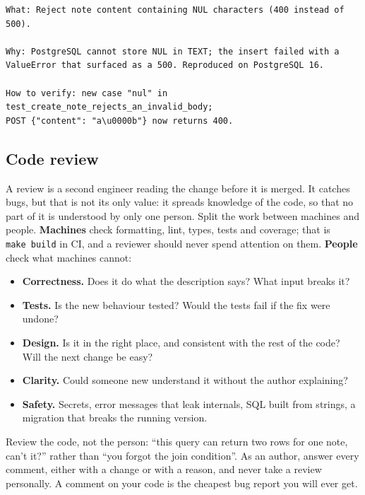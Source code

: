 \begin{outputbox}[short]
\begin{Verbatim}[fontsize=\codesize, breaklines, breakanywhere, breaksymbolleft={\tiny\textcolor{muted}{$\hookrightarrow$}}]
What: Reject note content containing NUL characters (400 instead of 500).

Why: PostgreSQL cannot store NUL in TEXT; the insert failed with a
ValueError that surfaced as a 500. Reproduced on PostgreSQL 16.

How to verify: new case "nul" in test_create_note_rejects_an_invalid_body;
POST {"content": "a\u0000b"} now returns 400.
\end{Verbatim}
\end{outputbox}

\subsection*{Code review}\label{17-build-process:code-review}

A review is a second engineer reading the change before it is merged. It catches bugs, but that is not its only value: it spreads knowledge of the code, so that no part of it is understood by only one person. Split the work between machines and people. \textbf{Machines} check formatting, lint, types, tests and coverage; that is \texttt{make\ build} in CI, and a reviewer should never spend attention on them. \textbf{People} check what machines cannot:

\begin{itemize}
\tightlist
\item
  \textbf{Correctness.} Does it do what the description says? What input breaks it?
\item
  \textbf{Tests.} Is the new behaviour tested? Would the tests fail if the fix were undone?
\item
  \textbf{Design.} Is it in the right place, and consistent with the rest of the code? Will the next change be easy?
\item
  \textbf{Clarity.} Could someone new understand it without the author explaining?
\item
  \textbf{Safety.} Secrets, error messages that leak internals, SQL built from strings, a migration that breaks the running version.
\end{itemize}

\noindent{}Review the code, not the person: ``this query can return two rows for one note, can't it?'' rather than ``you forgot the join condition''. As an author, answer every comment, either with a change or with a reason, and never take a review personally. A comment on your code is the cheapest bug report you will ever get.

